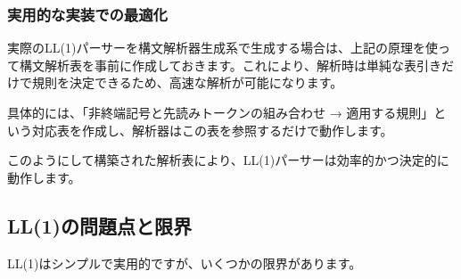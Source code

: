 \subsubsection{実用的な実装での最適化}

実際のLL(1)パーサーを構文解析器生成系で生成する場合は、上記の原理を使って構文解析表を事前に作成しておきます。これにより、解析時は単純な表引きだけで規則を決定できるため、高速な解析が可能になります。

具体的には、「非終端記号と先読みトークンの組み合わせ → 適用する規則」という対応表を作成し、解析器はこの表を参照するだけで動作します。

このようにして構築された解析表により、LL(1)パーサーは効率的かつ決定的に動作します。

\subsection{LL(1)の問題点と限界}

LL(1)はシンプルで実用的ですが、いくつかの限界があります。

